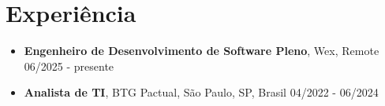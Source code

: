 \section{Experiência}
	\begin{itemize}[noitemsep, left=0pt, labelsep = 0pt]
		\item[\linkedlist{Experiencia profissional 4}] { %
			\begin{Experience} %
				{\textbf{Engenheiro de Desenvolvimento de Software Pleno}, Wex, Remote}
				{06/2025 - presente}
			\end{Experience} 
			 
		}
		
		\item[\linkedlist{Experiencia profissional 3}] { %
			\begin{Experience} %
				{\textbf{Analista de TI}, BTG Pactual, São Paulo, SP, Brasil}
				{04/2022 - 06/2024}
			\end{Experience}
			
}
\end{itemize}
